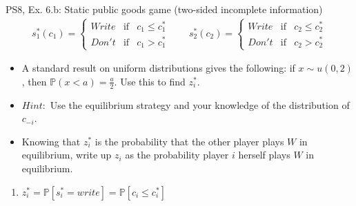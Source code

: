 \begin{frame}{PS8, Ex. 6.b: Static public goods game (two-sided incomplete information)}
    \begin{align*}
      s_1^*(c_1)=\left\{\begin{array}{rcl}
        Write & \text{if} & c_1\leq c_1^*\\
        Don't & \text{if} & c_1>c_1^*
        \end{array}\right.\quad\quad
      s_2^*(c_2)=\left\{\begin{array}{rcl}
        Write & \text{if} & c_2\leq c_2^*\\
        Don't & \text{if} & c_2>c_2^*
        \end{array}\right.
    \end{align*}
    \vspace{-12pt}
    \begin{itemize}
      \item[(b)] A standard result on uniform distributions gives the following: if $x\sim u(0, 2)$, then $\mathbb{P}(x<a)=\frac{a}{2}$. Use this to find $z_i^*$.
      \item[]    $Hint:$ Use the equilibrium strategy and your knowledge of the distribution of $c_{-i}$.
    \end{itemize}
    \begin{multicols}{2}
      \begin{itemize}
        \item[Step 1:] Knowing that $z_i^*$ is the probability that the other player plays $W$ in equilibrium, write up $z_i$ as the probability player $i$ herself plays $W$ in equilibrium.
      \end{itemize}
      \vfill\null\columnbreak
      \begin{enumerate}
        \item $z_i^*=\mathbb{P}[s_i^*=write]=\mathbb{P}[c_i\leq c_i^*]$
      \end{enumerate}
      \vfill\null
    \end{multicols}
\end{frame}

